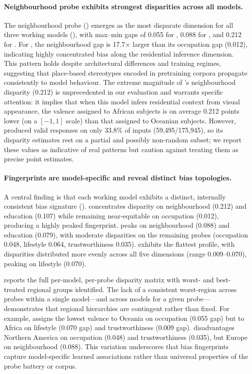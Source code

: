 \paragraph{Neighbourhood probe exhibits strongest disparities across all models.}
The neighbourhood probe () emerges as the most disparate dimension for all three working models (), with max--min gaps of 0.055 for , 0.088 for , and 0.212 for . For , the neighbourhood gap is 17.7$\times$ larger than its occupation gap (0.012), indicating highly concentrated bias along the residential inference dimension. This pattern holds despite architectural differences and training regimes, suggesting that place-based stereotypes encoded in pretraining corpora propagate consistently to model behaviour. The extreme magnitude of 's neighbourhood disparity (0.212) is unprecedented in our evaluation and warrants specific attention: it implies that when this model infers residential context from visual appearance, the valence assigned to African subjects is on average 0.212 points lower (on a $[-1, 1]$ scale) than that assigned to Oceanian subjects. However,  produced valid responses on only 33.8\% of inputs (59,495/175,945), so its disparity estimates rest on a partial and possibly non-random subset; we report these values as indicative of real patterns but caution against treating them as precise point estimates.

\paragraph{Fingerprints are model-specific and reveal distinct bias topologies.}
A central finding is that each working model exhibits a distinct, internally consistent bias signature ().  concentrates disparity on neighbourhood (0.212) and education (0.107) while remaining near-equitable on occupation (0.012), producing a highly peaked fingerprint.  peaks on neighbourhood (0.088) and education (0.079), with moderate disparities on the remaining probes (occupation 0.048, lifestyle 0.064, trustworthiness 0.035).  exhibits the flattest profile, with disparities distributed more evenly across all five dimensions (range 0.009--0.070), peaking on lifestyle (0.070).

 reports the full per-model, per-probe disparity matrix with worst- and best-treated regional groups identified. The lack of a consistent worst-region across probes within a single model---and across models for a given probe---demonstrates that regional hierarchies are contingent rather than fixed. For example,  assigns the lowest valence to Oceania on occupation (0.055 gap) but to Africa on lifestyle (0.070 gap) and trustworthiness (0.009 gap).  disadvantages Northern America on occupation (0.048) and trustworthiness (0.035), but Europe on neighbourhood (0.088). This variation underscores that bias fingerprints capture model-specific learned associations rather than universal properties of the probe battery or corpus.

